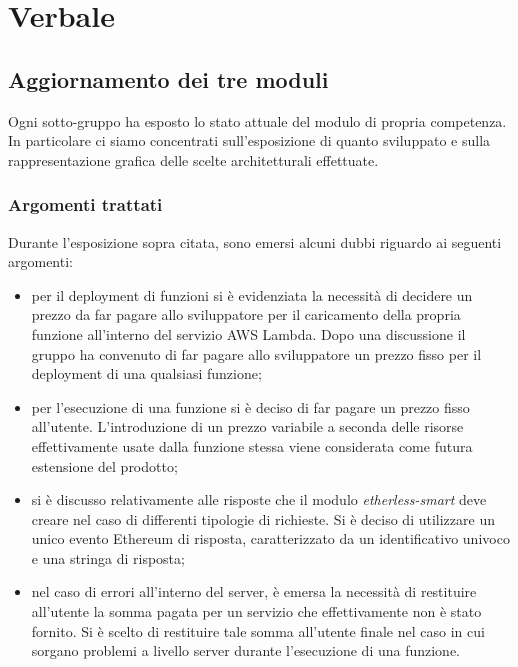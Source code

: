 \section{Verbale}
	\subsection{Aggiornamento dei tre moduli}
		Ogni sotto-gruppo ha esposto lo stato attuale del modulo\textit{} di propria competenza.	In particolare ci siamo concentrati sull'esposizione di quanto sviluppato e sulla rappresentazione grafica delle scelte architetturali effettuate.
		
		\subsubsection{Argomenti trattati}
			Durante l'esposizione sopra citata, sono emersi alcuni dubbi riguardo ai seguenti argomenti:
			\begin{itemize}
				\item per il deployment di funzioni si è evidenziata la necessità di decidere un prezzo da far pagare allo sviluppatore per il caricamento della propria funzione all'interno del servizio AWS Lambda. Dopo una discussione il gruppo ha convenuto di far pagare allo sviluppatore un prezzo fisso per il deployment di una qualsiasi funzione;
				\item per l'esecuzione di una funzione si è deciso di far pagare un prezzo fisso all'utente. L'introduzione di un prezzo variabile a seconda delle risorse effettivamente usate dalla funzione stessa viene considerata come futura estensione del prodotto; 
				\item si è discusso relativamente alle risposte che il modulo \textit{etherless-smart} deve creare nel caso di differenti tipologie di richieste. Si è deciso di utilizzare un unico evento Ethereum di risposta, caratterizzato da un identificativo univoco e una stringa di risposta;
				\item nel caso di errori all'interno del server, è emersa la necessità di restituire all'utente la somma pagata per un servizio che effettivamente non è stato fornito. Si è scelto di restituire tale somma all'utente finale nel caso in cui sorgano problemi a livello server durante l'esecuzione di una funzione.
			\end{itemize}
		
